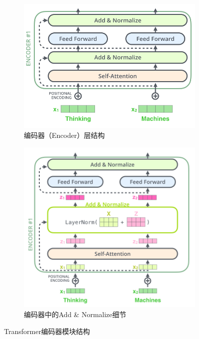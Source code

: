 \begin{figure}[H]
    \centering
    \begin{subfigure}[b]{0.48\textwidth}
        \centering
        \includegraphics[width=\textwidth]{figures/T7.png}
        \caption{编码器（Encoder）层结构}
        \label{fig:encoder_block_1}
    \end{subfigure}
    \hfill
    \begin{subfigure}[b]{0.48\textwidth}
        \centering
        \includegraphics[width=\textwidth]{figures/T8.png}
        \caption{编码器中的Add \& Normalize细节}
        \label{fig:encoder_block_2}
    \end{subfigure}
    \caption{Transformer编码器模块结构}
    \label{fig:encoder_block}
\end{figure}

